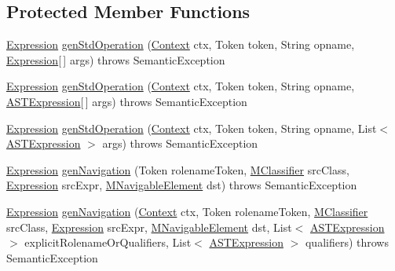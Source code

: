 \subsection*{Protected Member Functions}
\begin{DoxyCompactItemize}
\item 
\hyperlink{classorg_1_1tzi_1_1use_1_1uml_1_1ocl_1_1expr_1_1_expression}{Expression} \hyperlink{classorg_1_1tzi_1_1use_1_1parser_1_1ocl_1_1_a_s_t_expression_a43a0639a0a606fca5c895196dd772a76}{gen\-Std\-Operation} (\hyperlink{classorg_1_1tzi_1_1use_1_1parser_1_1_context}{Context} ctx, Token token, String opname, \hyperlink{classorg_1_1tzi_1_1use_1_1uml_1_1ocl_1_1expr_1_1_expression}{Expression}\mbox{[}$\,$\mbox{]} args)  throws Semantic\-Exception     
\item 
\hyperlink{classorg_1_1tzi_1_1use_1_1uml_1_1ocl_1_1expr_1_1_expression}{Expression} \hyperlink{classorg_1_1tzi_1_1use_1_1parser_1_1ocl_1_1_a_s_t_expression_af46c729f5cbe38b9a7063ff17597b721}{gen\-Std\-Operation} (\hyperlink{classorg_1_1tzi_1_1use_1_1parser_1_1_context}{Context} ctx, Token token, String opname, \hyperlink{classorg_1_1tzi_1_1use_1_1parser_1_1ocl_1_1_a_s_t_expression}{A\-S\-T\-Expression}\mbox{[}$\,$\mbox{]} args)  throws Semantic\-Exception     
\item 
\hyperlink{classorg_1_1tzi_1_1use_1_1uml_1_1ocl_1_1expr_1_1_expression}{Expression} \hyperlink{classorg_1_1tzi_1_1use_1_1parser_1_1ocl_1_1_a_s_t_expression_a59e8f1202e6ca76054c958a549ee592f}{gen\-Std\-Operation} (\hyperlink{classorg_1_1tzi_1_1use_1_1parser_1_1_context}{Context} ctx, Token token, String opname, List$<$ \hyperlink{classorg_1_1tzi_1_1use_1_1parser_1_1ocl_1_1_a_s_t_expression}{A\-S\-T\-Expression} $>$ args)  throws Semantic\-Exception     
\item 
\hyperlink{classorg_1_1tzi_1_1use_1_1uml_1_1ocl_1_1expr_1_1_expression}{Expression} \hyperlink{classorg_1_1tzi_1_1use_1_1parser_1_1ocl_1_1_a_s_t_expression_ac8002592796f9e5e027cdecef70a0a92}{gen\-Navigation} (Token rolename\-Token, \hyperlink{interfaceorg_1_1tzi_1_1use_1_1uml_1_1mm_1_1_m_classifier}{M\-Classifier} src\-Class, \hyperlink{classorg_1_1tzi_1_1use_1_1uml_1_1ocl_1_1expr_1_1_expression}{Expression} src\-Expr, \hyperlink{interfaceorg_1_1tzi_1_1use_1_1uml_1_1mm_1_1_m_navigable_element}{M\-Navigable\-Element} dst)  throws Semantic\-Exception 
\item 
\hyperlink{classorg_1_1tzi_1_1use_1_1uml_1_1ocl_1_1expr_1_1_expression}{Expression} \hyperlink{classorg_1_1tzi_1_1use_1_1parser_1_1ocl_1_1_a_s_t_expression_a5e3582962a43fee2189dfe0d2f273a87}{gen\-Navigation} (\hyperlink{classorg_1_1tzi_1_1use_1_1parser_1_1_context}{Context} ctx, Token rolename\-Token, \hyperlink{interfaceorg_1_1tzi_1_1use_1_1uml_1_1mm_1_1_m_classifier}{M\-Classifier} src\-Class, \hyperlink{classorg_1_1tzi_1_1use_1_1uml_1_1ocl_1_1expr_1_1_expression}{Expression} src\-Expr, \hyperlink{interfaceorg_1_1tzi_1_1use_1_1uml_1_1mm_1_1_m_navigable_element}{M\-Navigable\-Element} dst, List$<$ \hyperlink{classorg_1_1tzi_1_1use_1_1parser_1_1ocl_1_1_a_s_t_expression}{A\-S\-T\-Expression} $>$ explicit\-Rolename\-Or\-Qualifiers, List$<$ \hyperlink{classorg_1_1tzi_1_1use_1_1parser_1_1ocl_1_1_a_s_t_expression}{A\-S\-T\-Expression} $>$ qualifiers)  throws Semantic\-Exception     

\end{DoxyCompactItemize}
